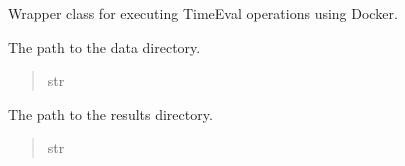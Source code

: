 \documentclass[letterpaper,10pt,english]{sphinxmanual}
\begin{document}
\begin{fulllineitems}
\label{\detokenize{modules:application.services.TimeEvalWrapper.TimeEvalWrapper}}
\pysigstartsignatures
{}
\pysigstopsignatures
\sphinxAtStartPar
Wrapper class for executing TimeEval operations using Docker.

\begin{fulllineitems}
\label{\detokenize{modules:application.services.TimeEvalWrapper.TimeEvalWrapper.data_path}}
\pysigstartsignatures
{}
\pysigstopsignatures
\sphinxAtStartPar
The path to the data directory.
\begin{quote}\begin{description}
\sphinxAtStartPar
str

\end{description}\end{quote}

\end{fulllineitems}


\begin{fulllineitems}
\label{\detokenize{modules:application.services.TimeEvalWrapper.TimeEvalWrapper.results_path}}
\pysigstartsignatures
{}
\pysigstopsignatures
\sphinxAtStartPar
The path to the results directory.
\begin{quote}\begin{description}
\sphinxAtStartPar
str

\end{description}\end{quote}

\end{fulllineitems}


\end{fulllineitems}
\end{document}

